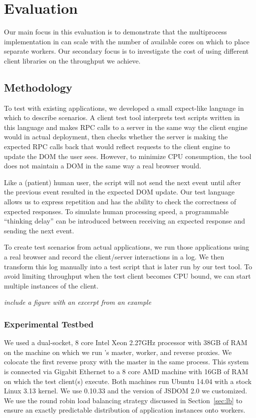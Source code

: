 \chapter{Evaluation}

Our main focus in this evaluation is to demonstrate that the multiprocess implementation
in \cbtwo can scale with the number of available cores on which to place separate workers.
Our secondary focus is to investigate the cost of using different client libraries on 
the throughput we achieve.

\section{Methodology}
To test \cbtwo with existing applications, we developed a small expect-like language 
in which to describe scenarios. A client test tool interprets test scripts written in
this language and makes RPC calls to a server in the same way the client engine would
in actual deployment, then checks whether the server is making the expected RPC
calls back that would reflect requests to the client engine to update the DOM the
user sees.  
However, to minimize CPU consumption, the tool does not maintain a DOM in the same
way a real browser would.

Like a (patient) human user, the script will not send the next event until after the
previous event resulted in the expected DOM update.
Our test language allows us to express repetition and has the ability to check
the correctness of expected responses.
To simulate human processing speed, a programmable ``thinking delay'' can be introduced 
between receiving an expected response and sending the next event.

To create test scenarios from actual applications,
we run those applications using a real browser and record the client/server interactions
in a log.  We then transform this log manually into a test script that is later run 
by our test tool.  To avoid limiting throughput when the test client becomes CPU bound,
we can start multiple instances of the client.

\emph{include a figure with an excerpt from an example}

\subsection{Experimental Testbed}
We used a dual-socket, 8 core Intel Xeon 2.27GHz processor with 38GB of RAM on
the machine on which we run \cbtwo{}'s master, worker, and reverse proxies.
We colocate the first reverse proxy with the master in the same process. This
system is connected via Gigabit Ethernet to a 8 core AMD machine with 16GB of
RAM on which the test client(s) execute. Both machines run  Ubuntu 14.04 with
a stock Linux 3.13 kernel.  We use \nodejs{} 0.10.33 and the version of JSDOM
2.0 we customized.  We use the round robin load balancing strategy discussed in
Section~\ref{sec:lb} to ensure an exactly predictable distribution
of application instances onto workers.

